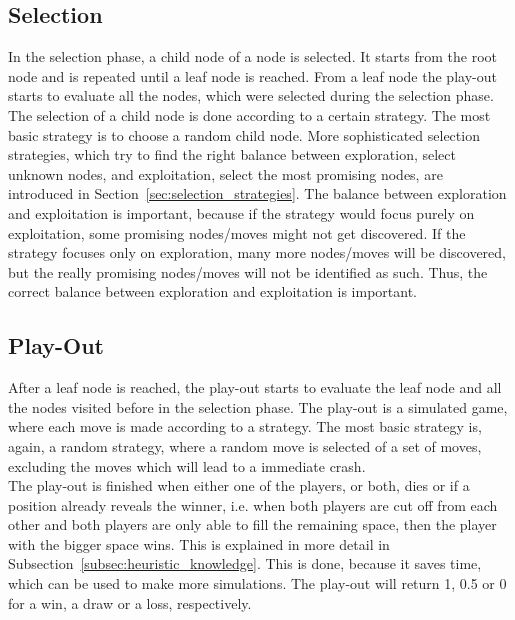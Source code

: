 
\subsection{Selection}
\label{subsec:selection}
In the selection phase, a child node of a node is selected. It starts from the root node and is repeated until a leaf node is reached. From a leaf node the play-out starts to evaluate all the nodes, which were selected during the selection phase. The selection of a child node is done according to a certain strategy. The most basic strategy is to choose a random child node. More sophisticated selection strategies, which try to find the right balance between exploration, select unknown nodes, and exploitation, select the most promising nodes, are introduced in Section~\ref{sec:selection_strategies}. The balance between exploration and exploitation is important, because if the strategy would focus purely on exploitation, some promising nodes/moves might not get discovered. If the strategy focuses only on exploration, many more nodes/moves will be discovered, but the really promising nodes/moves will not be identified as such. Thus, the correct balance between exploration and exploitation is important.

\subsection{Play-Out}
\label{subsec:play_out}
After a leaf node is reached, the play-out starts to evaluate the leaf node and all the nodes visited before in the selection phase. The play-out is a simulated game, where each move is made according to a strategy. The most basic strategy is, again, a random strategy, where a random move is selected of a set of moves, excluding the moves which will lead to a immediate crash.\\
The play-out is finished when either one of the players, or both, dies or if a position already reveals the winner, i.e. when both players are cut off from each other and both players are only able to fill the remaining space, then the player with the bigger space wins. This is explained in more detail in Subsection~\ref{subsec:heuristic_knowledge}. This is done, because it saves time, which can be used to make more simulations. The play-out will return 1, 0.5 or 0 for a win, a draw or a loss, respectively.

